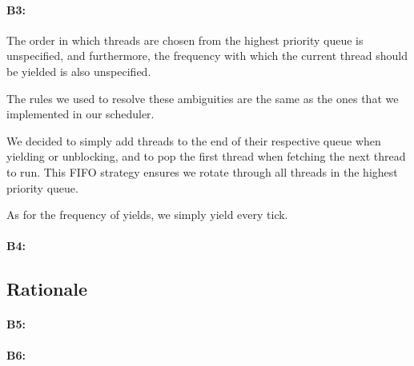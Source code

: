 \paragraph{B3:} %

The order in which threads are chosen from the highest priority queue is
unspecified, and furthermore, the frequency with which the current thread should
be yielded is also unspecified.

The rules we used to resolve these ambiguities are the same as the ones that we
implemented in our scheduler.

We decided to simply add threads to the end of their respective queue when
yielding or unblocking, and to pop the first thread when fetching the next
thread to run. This FIFO strategy ensures we rotate through all threads in the
highest priority queue.

As for the frequency of yields, we simply yield every tick.

\paragraph{B4:} %

\subsection{Rationale}
\paragraph{B5:} %

\paragraph{B6:} %
